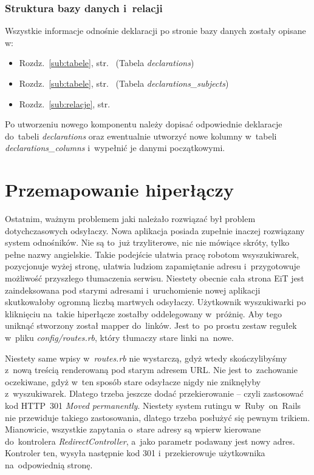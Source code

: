 \documentclass[a4paper,12pt,oneside]{report}
\begin{document}
\subsubsection{Struktura bazy danych i~relacji}
Wszystkie informacje odnośnie deklaracji po stronie bazy danych zostały opisane w:
\begin{itemize}
  \item Rozdz.~\ref{sub:tabele}, str.~\pageref{subsub:declarations} (Tabela \emph{declarations})
  \item Rozdz.~\ref{sub:tabele}, str.~\pageref{subsub:declarations_subjects} (Tabela \emph{declarations\_subjects})
  \item Rozdz.~\ref{sub:relacje}, str.~\pageref{subsub:declarations-declarations_subjects}
\end{itemize}

Po utworzeniu nowego komponentu należy dopisać odpowiednie deklaracje do~tabeli \emph{declarations} oraz ewentualnie utworzyć nowe kolumny w~tabeli \emph{declarations\_columns} i~wypełnić je danymi początkowymi.

\section{Przemapowanie hiperłączy}
\label{sec:mapa-linkow}
Ostatnim, ważnym problemem jaki należało rozwiązać był problem dotychczasowych odsyłaczy. Nowa aplikacja posiada zupełnie inaczej rozwiązany system odnośników. Nie są to~już trzyliterowe, nic nie mówiące skróty, tylko pełne nazwy angielskie. Takie podejście ułatwia pracę robotom wsyszukiwarek, pozycjonuje wyżej stronę, ułatwia ludziom zapamiętanie adresu i~przygotowuje możliwość przyszłego tłumaczenia serwisu. Niestety obecnie cała strona EiT jest zaindeksowana pod starymi adresami i~uruchomienie nowej aplikacji skutkowałoby ogromną liczbą martwych odsyłaczy. Użytkownik wyszukiwarki po kliknięciu na~takie hiperłącze zostałby oddelegowany w~próżnię. Aby tego uniknąć stworzony został mapper do~linków. Jest to~po prostu zestaw regułek w~pliku \emph{config/routes.rb}, który tłumaczy stare linki na~nowe.

Niestety same wpisy w~\emph{routes.rb} nie wystarczą, gdyż wtedy skończylibyśmy z~nową treścią renderowaną pod starym adresem URL. Nie jest to~zachowanie oczekiwane, gdyż w~ten sposób stare odsyłacze nigdy nie zniknęłyby z~wyszukiwarek. Dlatego trzeba jeszcze dodać przekierowanie -- czyli zastosować kod HTTP~301 \emph{Moved permanently}. Niestety system rutingu w~Ruby~on~Rails nie przewiduje takiego zastosowania, dlatego trzeba posłużyć się pewnym trikiem. Mianowicie, wszystkie zapytania o~stare adresy są wpierw kierowane do~kontrolera \emph{RedirectController}, a~jako parametr podawany jest nowy adres. Kontroler ten, wysyła następnie kod 301 i~przekierowuje użytkownika na~odpowiednią stronę.
\end{document}
